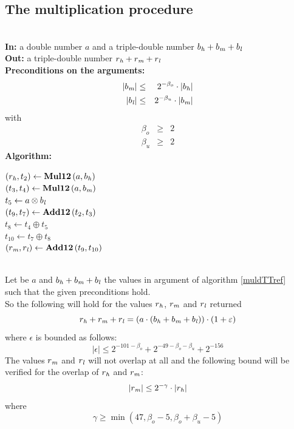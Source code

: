 \subsection{The multiplication procedure \MuldTT}
\begin{algorithm}[\MuldTT] \label{muldTTref} ~ \\
{\bf In:} a double number $a$  and a triple-double number $b_{\mathit{h}} + b_{\mathit{m}} + b_{\mathit{l}}$ \\
{\bf Out:} a triple-double number $r_{\mathit{h}} + r_{\mathit{m}} + r_{\mathit{l}}$ \\
{\bf Preconditions on the arguments:}
\begin{eqnarray*}
\left \vert b_{\mathit{m}} \right \vert & \leq & 2^{-\beta_o} \cdot \left \vert b_{\mathit{h}} \right \vert \\
\left \vert b_{\mathit{l}} \right \vert & \leq & 2^{-\beta_u} \cdot \left \vert b_{\mathit{m}} \right \vert 
\end{eqnarray*}
with
\begin{eqnarray*}
\beta_o & \geq & 2 \\
\beta_u & \geq & 2 
\end{eqnarray*}
{\bf Algorithm:} \\
\begin{center}
\begin{minipage}[b]{60mm}
$\left( r_{\mathit{h}}, t_2 \right) \gets \mathbf{Mul12}\left( a, b_{\mathit{h}} \right)$ \\
$\left( t_3, t_4 \right) \gets \mathbf{Mul12}\left( a, b_{\mathit{m}} \right)$ \\
$t_5 \gets a \otimes b_{\mathit{l}}$ \\
$\left( t_9, t_7 \right) \gets \mathbf{Add12}\left( t_2, t_3 \right)$ \\
$t_8 \gets t_4 \oplus t_5$ \\
$t_{10} \gets t_7 \oplus t_8$ \\
$\left( r_{\mathit{m}}, r_{\mathit{l}} \right) \gets \mathbf{Add12}\left( t_9, t_{10} \right)$ 
\end{minipage}
\end{center}
\end{algorithm}
\begin{theorem} ~ \\
Let be $a$ and $b_{\mathit{h}} + b_{\mathit{m}} + b_{\mathit{l}}$ the values in argument of algorithm \ref{muldTTref} \MuldTT~ such that 
the given preconditions hold.\\
So the following will hold for the values $r_{\mathit{h}}$, $r_{\mathit{m}}$ and $r_{\mathit{l}}$ returned
$$r_{\mathit{h}} + r_{\mathit{m}} + r_{\mathit{l}} = \left( a \cdot \left( b_{\mathit{h}} + b_{\mathit{m}} + b_{\mathit{l}} \right)\right) \cdot \left(1 + \varepsilon\right)$$
where $\epsilon$ is bounded as follows:
$$\left \vert \epsilon \right \vert \leq 2^{-101 - \beta_o} + 2^{-49 - \beta_o - \beta_u} + 2^{-156}$$
The values $r_{\mathit{m}}$ and  $r_{\mathit{l}}$ will not overlap at all and the following bound will be verified for the overlap of 
$r_{\mathit{h}}$ and $r_{\mathit{m}}$:
$$\left \vert r_{\mathit{m}} \right \vert \leq 2^{-\gamma} \cdot \left \vert r_{\mathit{h}} \right \vert$$
where
$$\gamma \geq \min\left( 47, \beta_o - 5, \beta_o + \beta_u - 5 \right)$$
\end{theorem}

